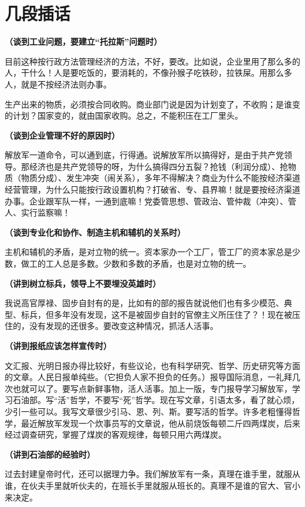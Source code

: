 \section[几段插话（一九六四年一月）]{几段插话}


\textbf{（谈到工业问题，要建立“托拉斯”问题时）}

目前这种按行政方法管理经济的方法，不好，要改。比如说，企业里用了那么多的人，干什么！人是要吃饭的，要消耗的，不像孙猴子吃铁砂，拉铁屎。用那么多人，就是不按经济法则办事。

生产出来的物质，必须按合同收购。商业部门说是因为计划变了，不收购；是谁变的计划？国家变的，就由国家收购。总之，不能积压在工厂里头。

\textbf{（谈到企业管理不好的原因时）}

解放军一道命令，可以通到底，行得通。说解放军所以搞得好，是由于共产党领导。那经济也是共产党领导的呀，为什么搞得四分五裂？抢钱（利润分成）、抢物质（物质分成）、发生冲突（闹关系），多年不得解决？商业为什么不能按经济渠道经营管理，为什么只能按行政设置机构？打破省、专、县界嘛！就是要按经济渠道办事。企业跟军队一样，一通到底嘛！党委管思想、管政治、管仲裁（冲突）、管人、实行监察嘛！

\textbf{（谈到专业化和协作、制造主机和辅机的关系时）}

主机和辅机的矛盾，是对立物的统一。资本家办一个工厂，管工厂的资本家总是少数，做工的工人总是多数。少数和多数的矛盾，也是对立物的统一。

\textbf{（讲到树立标兵，领导上不要埋没英雄时）}

我说高官厚禄、固步自封有的是，比如有的部的报告就说他们也有多少模范、典型、标兵，但多年没有发现，这不是被固步自封的官僚主义所压住了？！现在被压住的，没有发现的还很多。要改变这种情况，抓活人活事。

\textbf{（讲到报纸应该怎样宣传时）}

文汇报、光明日报办得比较好，有些议论，也有科学研究、哲学、历史研究等方面的文章。人民日报单纯些。（它担负人家不担负的任务。）报导国际消息，一礼拜几次也就可以了。要写点新鲜事物，活人活事。加上一版，专门报导学习解放军，学习石油部。写“活”哲学，不要写“死”哲学。现在写文章，引语太多，看了就心烦，少引一些可以。我写文章很少引马、恩、列、斯。要写活的哲学。许多老粗懂得哲学，最近解放军发现一个炊事员写的文章说，他从前烧饭每顿二斤四两煤炭，后来经过调查研究，掌握了煤炭的客观规律，每顿只用六两煤炭。

\textbf{（讲到石油部的经验时）}

过去封建皇帝时代，还可以据理力争。我们解放军有一条，真理在谁手里，就服从谁，在伙夫手里就听伙夫的，在班长手里就服从班长的。真理不是谁的官大、官小来决定。

